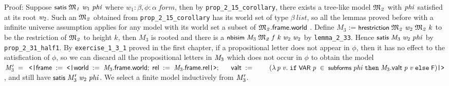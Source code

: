 \documentclass[letterpaper]{article}
\renewcommand{\HOLConst}[1]{{\textsf{\upshape\small #1}}}
\renewcommand{\HOLinline}[1]{\ensuremath{#1}}
\renewcommand{\HOLKeyword}[1]{\texttt{#1}}
\begin{document}
Proof: Suppose \HOLinline{\HOLConst{satis}\;\HOLFreeVar{\ensuremath{\mathfrak{M}\sb{1}}}\;\HOLFreeVar{w\sb{\mathrm{1}}}\;\HOLFreeVar{phi}} where $w_1:\beta,\phi:\alpha\ form$, then by \texttt{prop_2_15_corollary}, there exists a tree-like model \HOLinline{\HOLFreeVar{\ensuremath{\mathfrak{M}\sb{2}}}} with \HOLinline{\HOLFreeVar{phi}} satisfied at its root \HOLinline{\HOLFreeVar{w\sb{\mathrm{2}}}}. Such an \HOLinline{\HOLFreeVar{\ensuremath{\mathfrak{M}\sb{2}}}} obtained from \texttt{prop_2_15_corollary} has its world set of type $\beta\ list$, so all the lemmas proved before with a infinite universe assumption applies for any model with its world set a subset of \HOLinline{\HOLFreeVar{\ensuremath{\mathfrak{M}\sb{2}}}.\HOLFieldName{frame}.\HOLFieldName{world}} . Define $M_3:=$\HOLinline{\HOLConst{hrestriction}\;\HOLFreeVar{\ensuremath{\mathfrak{M}\sb{2}}}\;\HOLFreeVar{w\sb{\mathrm{2}}}\;\HOLFreeVar{\ensuremath{\mathfrak{M}\sb{2}}}\;\HOLFreeVar{k}} to be the restriction of \HOLinline{\HOLFreeVar{\ensuremath{\mathfrak{M}\sb{2}}}} to height $k$, then $M_3$ is rooted and there is a \HOLinline{\HOLConst{nbisim}\;\HOLFreeVar{M\sb{\mathrm{3}}}\;\HOLFreeVar{\ensuremath{\mathfrak{M}\sb{2}}}\;\HOLFreeVar{f}\;\HOLFreeVar{k}\;\HOLFreeVar{w\sb{\mathrm{2}}}\;\HOLFreeVar{w\sb{\mathrm{2}}}} by \texttt{lemma_2_33}. Hence \HOLinline{\HOLConst{satis}\;\HOLFreeVar{M\sb{\mathrm{3}}}\;\HOLFreeVar{w\sb{\mathrm{2}}}\;\HOLFreeVar{phi}} by \texttt{prop_2_31_half1}. By \texttt{exercise_1_3_1} proved in the first chapter, if a propositional letter does not appear in $\phi$, then it has no effect to the satisfication of $\phi$, so we can discard all the propositional letters in \HOLinline{\HOLFreeVar{M\sb{\mathrm{3}}}} which does not occur in $\phi$ to obtain the model \HOLinline{\HOLFreeVar{M\sb{\mathrm{3}}\sp{\prime}}\;\HOLSymConst{=}\\
\;\;\HOLTokenLeftrec{}\HOLFieldName{frame}\;:=\;\HOLTokenLeftrec{}\HOLFieldName{world}\;:=\;\HOLFreeVar{M\sb{\mathrm{3}}}.\HOLFieldName{frame}.\HOLFieldName{world};\;\HOLFieldName{rel}\;:=\;\HOLFreeVar{M\sb{\mathrm{3}}}.\HOLFieldName{frame}.\HOLFieldName{rel}\HOLTokenRightrec{};\\
\;\;\;\;\;\;\HOLFieldName{valt}\;:=\\
\;\;\;\;\;\;\;\;(\HOLTokenLambda{}\HOLBoundVar{p}\;\HOLBoundVar{v}.\;\HOLKeyword{if}\;\HOLConst{VAR}\;\HOLBoundVar{p}\;\HOLSymConst{\HOLTokenIn{}}\;\HOLConst{subforms}\;\HOLFreeVar{phi}\;\HOLKeyword{then}\;\HOLFreeVar{M\sb{\mathrm{3}}}.\HOLFieldName{valt}\;\HOLBoundVar{p}\;\HOLBoundVar{v}\;\HOLKeyword{else}\;\HOLConst{F})\HOLTokenRightrec{}}, and still have \HOLinline{\HOLConst{satis}\;\HOLFreeVar{M\sb{\mathrm{3}}\sp{\prime}}\;\HOLFreeVar{w\sb{\mathrm{2}}}\;\HOLFreeVar{phi}}. We select a finite model inductively from \HOLinline{\HOLFreeVar{M\sb{\mathrm{3}}\sp{\prime}}}.
\end{document}
